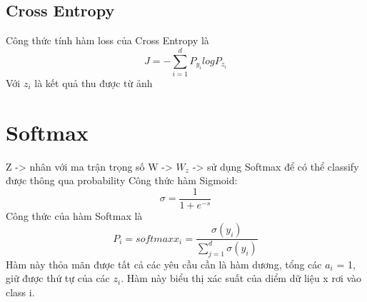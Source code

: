 \documentclass{article}
\begin{document}
\subsection{Cross Entropy}
Công thức tính hàm loss của Cross Entropy là 
$$J = -\sum_{i=1} ^{d} P_y_i logP_z_i  $$
Với $z_i$ là kết quả thu được từ ảnh 
\section{Softmax}
Z -> nhân với ma trận trọng số W -> $W_z$ -> sử dụng Softmax để có thể classify được thông qua probability
\newline
Công thức hàm Sigmoid: 
$$\sigma = \frac{1}{1+e^{-s}}    $$
Công thức của hàm Softmax là 
$$P_i = softmax x_i = \frac{\sigma(y_i)}{\sum_{j=1}^{d}\sigma(y_i) }   $$
Hàm này thỏa mãn được tất cả các yêu cầu cần là hàm dương, tổng các $a_i$ = 1, giữ được thứ tự của các $z_i$. Hàm này biểu thị xác suất của diểm dữ liệu x rơi vào class i. 
\end{document}
